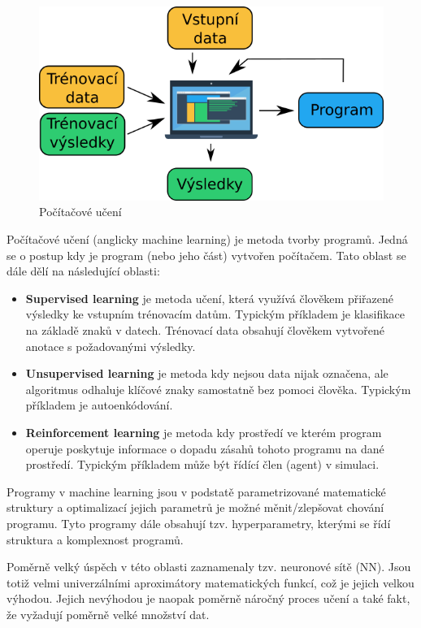 \begin{figure}[h] \centering \capstart
  \includegraphics[scale=0.6]{figures/machine_learning_cz}
  \caption{Počítačové učení}
  \label{fig:machine_learning}
\end{figure}
Počítačové učení (anglicky machine learning) je metoda tvorby programů. Jedná
se o postup kdy je program (nebo jeho část) vytvořen počítačem. Tato oblast se
dále dělí na následující oblasti:
\begin{itemize}
  \item
    \textbf{Supervised learning} je metoda učení, která využívá člověkem
    přiřazené výsledky ke vstupním trénovacím datům. Typickým příkladem je
    klasifikace na základě znaků v datech. Trénovací data obsahují člověkem
    vytvořené anotace s požadovanými výsledky.
  \item
    \textbf{Unsupervised learning} je metoda kdy nejsou data nijak označena,
    ale algoritmus odhaluje klíčové znaky samostatně bez pomoci člověka.
    Typickým příkladem je autoenkódování.
  \item
    \textbf{Reinforcement learning} je metoda kdy prostředí ve kterém program
    operuje poskytuje informace o dopadu zásahů tohoto programu na dané
    prostředí. Typickým příkladem může být řídící člen (agent) v simulaci.
\end{itemize}
Programy v machine learning jsou v podstatě
parametrizované matematické struktury a optimalizací jejich parametrů je možné
měnit/zlepšovat chování programu. Tyto programy dále obsahují tzv.
hyperparametry, kterými se řídí struktura a komplexnost programů.

Poměrně velký úspěch v této oblasti zaznamenaly tzv. neuronové sítě (NN). Jsou
totiž velmi univerzálními aproximátory matematických funkcí, což je jejich
velkou výhodou. Jejich nevýhodou je naopak poměrně náročný proces učení a také
fakt, že vyžadují poměrně velké množství dat.

